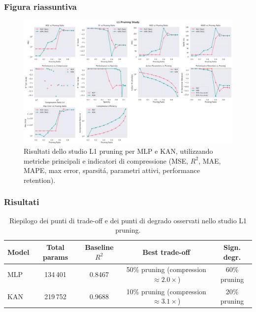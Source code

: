 \documentclass[a4paper,12pt]{report}
\begin{document}
	\subsubsection{Figura riassuntiva}
	\begin{figure}[H]
		\centering
		\includegraphics[width=1.0\textwidth]{img/abl_kanvsmlp_car.png}
		\caption{Risultati dello studio L1 pruning per MLP e KAN, utilizzando metriche principali e indicatori di compressione (MSE, \(R^2\), MAE, MAPE, max error, sparsitá, parametri attivi, performance retention).}
	\end{figure}
	
	\subsubsection{Risultati}
	\begin{table}[H]
		\centering
		\setlength{\tabcolsep}{4pt}
		\begin{tabular}{lcccc}
			\toprule
			\textbf{Model} & \textbf{Total params} & \textbf{Baseline $R^2$} & \textbf{Best trade-off} & \textbf{Sign. degr.} \\
			\midrule
			MLP & 134\,401  & 0.8467 & 50\% pruning (compression $\approx 2.0\times$) & 60\% pruning \\
			KAN & 219\,752  & 0.9688 & 10\% pruning (compression $\approx 3.1\times$) & 20\% pruning \\
			\bottomrule
		\end{tabular}
		\caption{Riepilogo dei punti di trade-off e dei punti di degrado osservati nello studio L1 pruning.}
	\end{table}
	
\end{document}
